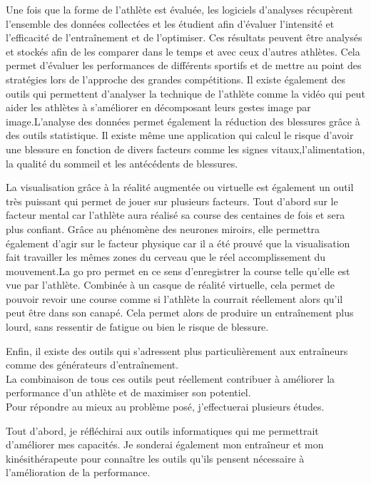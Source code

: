 Une fois que la forme de l'athlète est évaluée, les logiciels d'analyses récupèrent l’ensemble des données collectées et les étudient afin d’évaluer l’intensité et l’efficacité de l’entraînement et de l'optimiser. Ces résultats peuvent être analysés et stockés afin de les comparer dans le temps et avec ceux d’autres athlètes. Cela permet d’évaluer les performances de différents sportifs et de mettre au point des stratégies lors de l’approche des grandes compétitions. Il existe également des outils qui permettent d'analyser la technique de l'athlète comme la vidéo qui peut aider les athlètes à s’améliorer en décomposant leurs gestes image par image.L'analyse des données permet également la réduction des blessures grâce à des outils statistique. Il existe même une application qui calcul le risque d'avoir une blessure en fonction de divers facteurs comme les signes vitaux,l'alimentation, la qualité du sommeil et les antécédents de blessures.

La visualisation grâce à la réalité augmentée ou virtuelle est également un outil très puissant qui permet de jouer sur plusieurs facteurs. Tout d'abord sur le facteur mental car l'athlète aura réalisé sa course des centaines de fois et sera plus confiant. Grâce au phénomène des neurones miroirs, elle permettra également d'agir sur le facteur physique car il a été prouvé que la visualisation fait travailler les mêmes zones du cerveau que le réel accomplissement du mouvement.La go pro permet en ce sens d'enregistrer la course telle qu'elle est vue par l'athlète. Combinée à un casque de réalité virtuelle, cela permet de pouvoir revoir une course comme si l'athlète la courrait réellement alors qu'il peut être dans son canapé. Cela permet alors de produire un entraînement plus lourd, sans ressentir de fatigue ou bien le risque de blessure.


Enfin, il existe des outils qui s'adressent plus particulièrement aux entraîneurs comme des générateurs d'entraînement. \\

La combinaison de tous ces outils peut réellement contribuer à améliorer la performance d'un athlète et de maximiser son potentiel.\\

Pour répondre au mieux au problème posé, j'effectuerai plusieurs études.

Tout d'abord, je réfléchirai aux outils informatiques qui me permettrait d'améliorer mes capacités. Je sonderai également mon entraîneur et mon kinésithérapeute pour connaître les outils qu'ils pensent nécessaire à l'amélioration de la performance.

